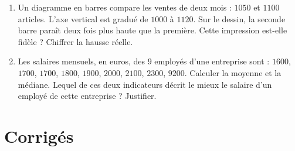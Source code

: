 \begin{enumerate}
  \item Un diagramme en barres compare les ventes de deux mois : $1050$ et $1100$
    articles. L'axe vertical est gradué de $1000$ à $1120$. Sur le dessin, la
    seconde barre paraît deux fois plus haute que la première. Cette impression
    est-elle fidèle ? Chiffrer la hausse réelle.

  \item Les salaires mensuels, en euros, des $9$ employés d'une entreprise sont :
    $1600$, $1700$, $1700$, $1800$, $1900$, $2000$, $2100$, $2300$, $9200$.
    Calculer la moyenne et la médiane. Lequel de ces deux indicateurs décrit le
    mieux le salaire d'un employé de cette entreprise ? Justifier.
\end{enumerate}

\ifnxVersionProfesseur
\section*{Corrigés}

